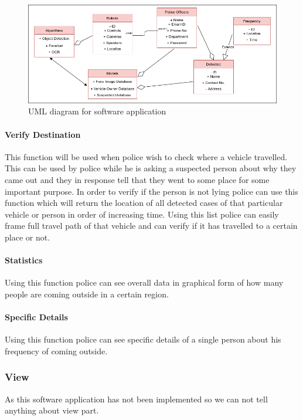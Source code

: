 \documentclass[10pt,twocolumn,letterpaper]{article}
\begin{document}
\begin{figure}
  \includegraphics[width=\textwidth]{uml.png}
  \caption{UML diagram for software application}
\end{figure}

\paragraph{Verify Destination} This function will be used when police wish to check where a vehicle travelled. This can be used by police while he is asking a suspected person about why they came out and they in response tell that they went to some place for some important purpose. In order to verify if the person is not lying police can use this function which will return the location of all detected cases of that particular vehicle or person in order of increasing time. Using this list police can easily frame full travel path of that vehicle and can verify if it has travelled to a certain place or not.

\paragraph{Statistics} Using this function police can see overall data in graphical form of how many people are coming outside in a certain region.
\paragraph{Specific Details} Using this function police can see specific details of a single person about his frequency of coming outside.
\subsubsection{View}
As this software application has not been implemented so we can not tell anything about view part.
\end{document}
